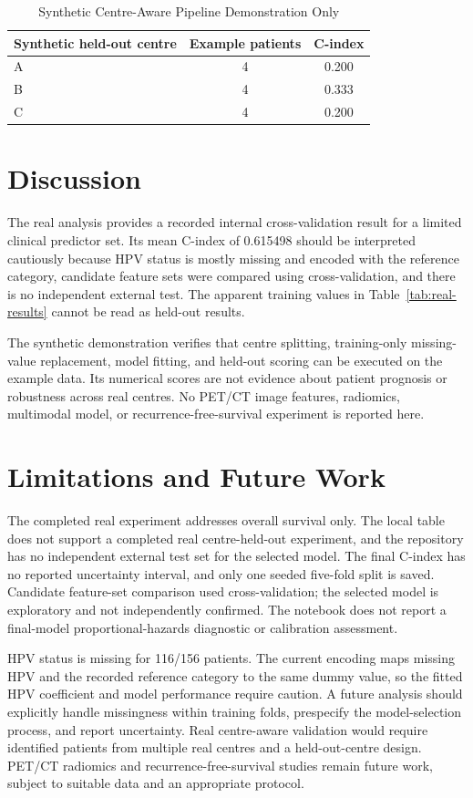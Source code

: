 \documentclass[conference]{IEEEtran}
\begin{document}
\begin{table}[!htbp]
\caption{Synthetic Centre-Aware Pipeline Demonstration Only}
\label{tab:synthetic}
\centering
\begin{tabular}{@{}lcc@{}}
\toprule
Synthetic held-out centre & Example patients & C-index \\
\midrule
A & 4 & 0.200 \\
B & 4 & 0.333 \\
C & 4 & 0.200 \\
\bottomrule
\end{tabular}
\end{table}

\section{Discussion}
The real analysis provides a recorded internal cross-validation result for a limited clinical predictor set. Its mean C-index of 0.615498 should be interpreted cautiously because HPV status is mostly missing and encoded with the reference category, candidate feature sets were compared using cross-validation, and there is no independent external test. The apparent training values in Table~\ref{tab:real-results} cannot be read as held-out results.

The synthetic demonstration verifies that centre splitting, training-only missing-value replacement, model fitting, and held-out scoring can be executed on the example data. Its numerical scores are not evidence about patient prognosis or robustness across real centres. No PET/CT image features, radiomics, multimodal model, or recurrence-free-survival experiment is reported here.

\section{Limitations and Future Work}
The completed real experiment addresses overall survival only. The local table does not support a completed real centre-held-out experiment, and the repository has no independent external test set for the selected model. The final C-index has no reported uncertainty interval, and only one seeded five-fold split is saved. Candidate feature-set comparison used cross-validation; the selected model is exploratory and not independently confirmed. The notebook does not report a final-model proportional-hazards diagnostic or calibration assessment.

HPV status is missing for 116/156 patients. The current encoding maps missing HPV and the recorded reference category to the same dummy value, so the fitted HPV coefficient and model performance require caution. A future analysis should explicitly handle missingness within training folds, prespecify the model-selection process, and report uncertainty. Real centre-aware validation would require identified patients from multiple real centres and a held-out-centre design. PET/CT radiomics and recurrence-free-survival studies remain future work, subject to suitable data and an appropriate protocol.
\end{document}

